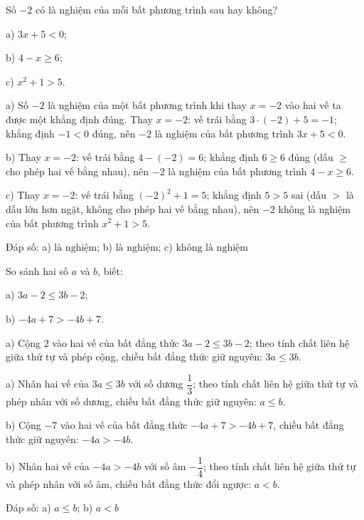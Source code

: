\begin{problem}[9DS-BPT-021]
Số $-2$ có là nghiệm của mỗi bất phương trình sau hay không?

a) $3x + 5 < 0$;

b) $4 - x \geq 6$;

c) $x^2 + 1 > 5$.

\begin{solution}
a) Số $-2$ là nghiệm của một bất phương trình khi thay $x = -2$ vào hai vế ta được một khẳng định đúng. Thay $x = -2$: vế trái bằng $3 \cdot (-2) + 5 = -1$; khẳng định $-1 < 0$ đúng, nên $-2$ là nghiệm của bất phương trình $3x + 5 < 0$.

b) Thay $x = -2$: vế trái bằng $4 - (-2) = 6$; khẳng định $6 \geq 6$ đúng (dấu $\geq$ cho phép hai vế bằng nhau), nên $-2$ là nghiệm của bất phương trình $4 - x \geq 6$.

c) Thay $x = -2$: vế trái bằng $(-2)^2 + 1 = 5$; khẳng định $5 > 5$ sai (dấu $>$ là dấu lớn hơn ngặt, không cho phép hai vế bằng nhau), nên $-2$ không là nghiệm của bất phương trình $x^2 + 1 > 5$.

Đáp số: a) $\boxed{\text{là nghiệm}}$; b) $\boxed{\text{là nghiệm}}$; c) $\boxed{\text{không là nghiệm}}$
\end{solution}
\end{problem}

\begin{problem}[9DS-BPT-022]
So sánh hai số $a$ và $b$, biết:

a) $3a - 2 \leq 3b - 2$;

b) $-4a + 7 > -4b + 7$.

\begin{solution}
a) Cộng $2$ vào hai vế của bất đẳng thức $3a - 2 \leq 3b - 2$; theo tính chất liên hệ giữa thứ tự và phép cộng, chiều bất đẳng thức giữ nguyên: $3a \leq 3b$.

a) Nhân hai vế của $3a \leq 3b$ với số dương $\dfrac{1}{3}$; theo tính chất liên hệ giữa thứ tự và phép nhân với số dương, chiều bất đẳng thức giữ nguyên: $a \leq b$.

b) Cộng $-7$ vào hai vế của bất đẳng thức $-4a + 7 > -4b + 7$, chiều bất đẳng thức giữ nguyên: $-4a > -4b$.

b) Nhân hai vế của $-4a > -4b$ với số âm $-\dfrac{1}{4}$; theo tính chất liên hệ giữa thứ tự và phép nhân với số âm, chiều bất đẳng thức đổi ngược: $a < b$.

Đáp số: a) $\boxed{a \leq b}$; b) $\boxed{a < b}$
\end{solution}
\end{problem}

